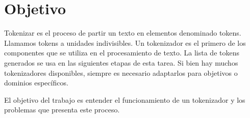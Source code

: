 \section{Objetivo}

Tokenizar es el proceso de partir un texto en elementos denominado tokens. Llamamos tokens a unidades indivisibles. Un tokenizador es el primero de los componentes que se utiliza en el procesamiento de texto. La lista de tokens generados se usa en las siguientes etapas de esta tarea. Si bien hay muchos tokenizadores disponibles, siempre es necesario adaptarlos para objetivos o dominios espec\'ificos. 

El objetivo del trabajo es entender el funcionamiento de un tokenizador y los problemas que presenta este proceso. 